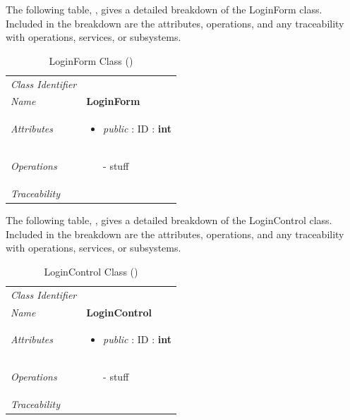 \documentclass[12pt,letterpaper]{article}
\begin{document}
The following table, , gives a detailed breakdown of the LoginForm class. Included in the breakdown are the attributes, operations, and any traceability with operations, services, or subsystems.

\begin{table}[H]
    \caption{LoginForm Class ()} 
	\begin{tabu} to 
		\toprule
		Class Identifier &  \\
		Name & {\bf LoginForm} \\
		Attributes & 
		\begin{minipage}[t]{\linewidth}
		    \begin{itemize}
		        \item \textit{public} : ID : \bf{int}
			\end{itemize}
	    \end{minipage} \\

		Operations &
		\begin{minipage}[t]{\linewidth}
			\begin{enumerate}
			    \item[-] stuff
	        \end{enumerate}
	    \end{minipage} \\
	    	Traceability & \\
		\toprule
	\end{tabu}
\end{table}

The following table, , gives a detailed breakdown of the LoginControl class. Included in the breakdown are the attributes, operations, and any traceability with operations, services, or subsystems.

\begin{table}[H]
    \caption{LoginControl Class ()} 
	\begin{tabu} to 
		\toprule
		Class Identifier &  \\
		Name & {\bf LoginControl} \\
		Attributes & 
		\begin{minipage}[t]{\linewidth}
		    \begin{itemize}
		        \item \textit{public} : ID : \bf{int}
			\end{itemize}
	    \end{minipage} \\

		Operations &
		\begin{minipage}[t]{\linewidth}
			\begin{enumerate}
			    \item[-] stuff
	        \end{enumerate}
	    \end{minipage} \\
	    	Traceability & \\
		\toprule
	\end{tabu}
\end{table}
\end{document}
